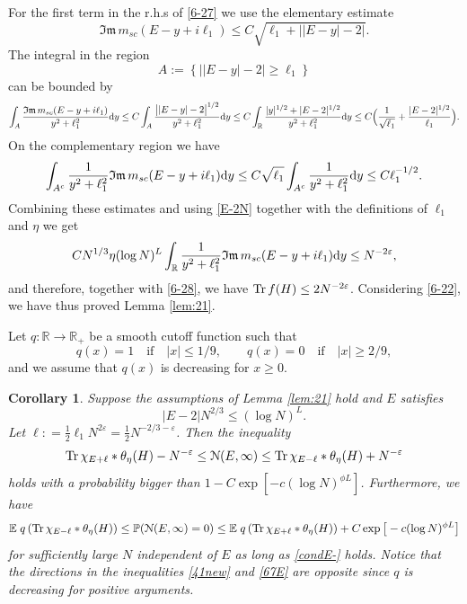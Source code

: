 \documentclass[draft]{article}
\newcommand{\e}{\varepsilon}
\newcommand{\rd}{{\rm d}}
\newcommand{\tr}{\mbox{Tr\,}}
\newcommand{\be}{\begin{equation}}
\newcommand{\ee}{\end{equation}}
\newcommand{\cN}{{\mathcal N}}
\newcommand{\im}{{\mathfrak{Im} \, }}
\newcommand{\E}{{\mathbb E }}
\newcommand{\R}{{\mathbb R }}
\renewcommand{\P}{{\mathbb P}}
\newtheorem{corollary}[theorem]{Corollary}
\newcommand{\qed}{\hfill\fbox{}\par\vspace{0.3mm}}
\numberwithin{equation}{section}
\numberwithin{theorem}{section}
\numberwithin{definition}{section}
\numberwithin{remark}{section}
\begin{document}
For the first term in the r.h.s of \eqref{6-27} we use the elementary estimate
$$
   \im m_{sc}( E-y+i\ell_1)\le C\sqrt{\ell_1+\big||E-y|-2\big|}.
$$
The integral in the region
$$
A:=\left \{ \big| |E-y|-2\big|\ge\ell_1\right \} 
$$
can be bounded by
$$
   \int_A  \frac {\im m_{sc}( E-y+i\ell_1)}{y^2 + \ell_1^2 }
  \rd y \le C \int_A  \frac{\big||E-y|-2\big|^{1/2}}
 {y^2 + \ell_1^2 }\rd y
  \le C \int_\R \frac {|y|^{1/2} + |E-2|^{1/2}} {y^2 + \ell_1^2 }\rd y
  \le C\Big( \frac{1}{\sqrt{\ell_1}} + \frac{|E-2|^{1/2}}{\ell_1}\Big) .
$$
On the complementary region we have
$$
   \int_{A^c}  \frac 1 {y^2 + \ell_1^2 }
 \im m_{sc}( E-y+i\ell_1) \rd y \le C \sqrt{\ell_1}
 \int_{A^c}  \frac 1 {y^2 + \ell_1^2 }\rd y \le C\ell_1^{-1/2}.
$$
Combining these estimates and using \eqref{E-2N} together with
the definitions of $\ell_1$ and $\eta$ we get
$$
CN^{1/3}  \eta (\log N)^L \int_\R  \frac 1 {y^2 + \ell_1^2 }  
 \im m_{sc}( E-y+i\ell_1)\rd y \le N^{-2\e},
$$
and therefore, together with  \eqref{6-28}, we have
 $\tr f(H)\le 2N^{-2\e}$. Considering \eqref{6-22}, we have thus
 proved Lemma
\ref{lem:21}.  
\qed


\medskip 

Let $q:\R \to\R_+$ be a smooth cutoff  function  such that
\[
q(x) = 1      \quad  \text{if} \quad |x| \le 1/9,   \qquad q(x) = 0   
   \quad  \text{if} \quad |x| \ge 2/9,
\]
and we assume that $q(x)$ is decreasing for $x\ge 0$.

\begin{corollary} \label{23} Suppose the assumptions of Lemma \ref{lem:21} hold and 
$E$ satisfies 
\be\label{condE-}
|E-2|N^{2/3}\leq (\log N)^L.
\ee
Let $\ell: = \frac{1}{2}\ell_1 N^{ 2\e} = \frac{1}{2}N^{-2/3 - \e}$.  
Then  the  inequality 
\be\label{41new}
\tr \chi_{E+ \ell  }  \ast \theta_\eta (H)  -  N^{-\e} \le  \cN (E, \infty)  \le  
\tr  \chi_{E- \ell  }  \ast \theta_\eta (H)  +  N^{-\e}
\ee
holds with a probability bigger than  $1 - C \exp [ - c(\log N)^{\phi L} ]$. Furthermore, 
we have
\be\label{67E}
\E\;  q \left(\tr \chi_{E-\ell}  \ast \theta_\eta  (H) \right)
\le \P (\cN(E,  \infty)  = 0 )  \le \E \; q \left(\tr \chi_{E+\ell}  \ast \theta_\eta  (H) \right) 
+ C\exp{\big[-c(\log N)^{\phi L} \big]}
\ee 
for sufficiently large $N$ independent of $E$ as long as \eqref{condE-} holds.  
Notice that the directions
in the inequalities \eqref{41new} and \eqref{67E} 
are opposite since $q$ is decreasing for positive arguments.

\end{corollary} 
\end{document}
